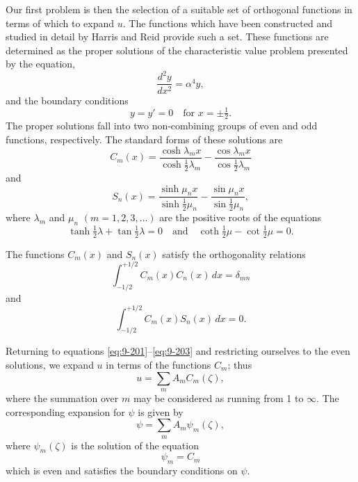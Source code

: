 Our first problem is then the selection of a suitable set of orthogonal functions in terms of which to expand $u$. The functions which have been constructed and studied in detail by Harris and Reid provide such a set. These functions are determined as the proper solutions of the characteristic value problem presented by the equation,
\begin{equation}
\frac{d^2 y}{dx^2} = \alpha^4 y, \label{eq:9-207}
\end{equation}
and the boundary conditions
\begin{equation}
y = y' = 0 \quad \text{for } x = \pm\tfrac{1}{2}. \label{eq:9-208}
\end{equation}
The proper solutions fall into two non-combining groups of even and odd functions, respectively. The standard forms of these solutions are
\begin{equation}
C_m(x) = \frac{\cosh \lambda_m x}{\cosh \frac{1}{2}\lambda_m} - \frac{\cos \lambda_m x}{\cos \frac{1}{2}\lambda_m} \label{eq:9-209}
\end{equation}
and
\begin{equation}
S_n(x) = \frac{\sinh \mu_n x}{\sinh \frac{1}{2}\mu_n} - \frac{\sin \mu_n x}{\sin \frac{1}{2}\mu_n}, \label{eq:9-210}
\end{equation}
where $\lambda_m$ and $\mu_n$ $(m = 1, 2, 3, \ldots)$ are the positive roots of the equations
\begin{equation}
\tanh \tfrac{1}{2}\lambda + \tan \tfrac{1}{2}\lambda = 0 \quad \text{and} \quad \coth \tfrac{1}{2}\mu - \cot \tfrac{1}{2}\mu = 0. \label{eq:9-211}
\end{equation}

The functions $C_m(x)$ and $S_n(x)$ satisfy the orthogonality relations
\begin{equation}
\int_{-1/2}^{+1/2} C_m(x) C_n(x)\, dx = \delta_{mn} \label{eq:9-212}
\end{equation}
and
\begin{equation}
\int_{-1/2}^{+1/2} C_m(x) S_n(x)\, dx = 0. \label{eq:9-213}
\end{equation}

Returning to equations \eqref{eq:9-201}--\eqref{eq:9-203} and restricting ourselves to the even solutions, we expand $u$ in terms of the functions $C_m$; thus
\begin{equation}
u = \sum_m A_m C_m(\zeta), \label{eq:9-214}
\end{equation}
where the summation over $m$ may be considered as running from 1 to $\infty$. The corresponding expansion for $\psi$ is given by
\begin{equation}
\psi = \sum_m A_m \psi_m(\zeta), \label{eq:9-215}
\end{equation}
where $\psi_m(\zeta)$ is the solution of the equation
\begin{equation}
[(D^2 - a^2)^2 + Qa^2]\psi_m = C_m \label{eq:9-216}
\end{equation}
which is even and satisfies the boundary conditions on $\psi$.

